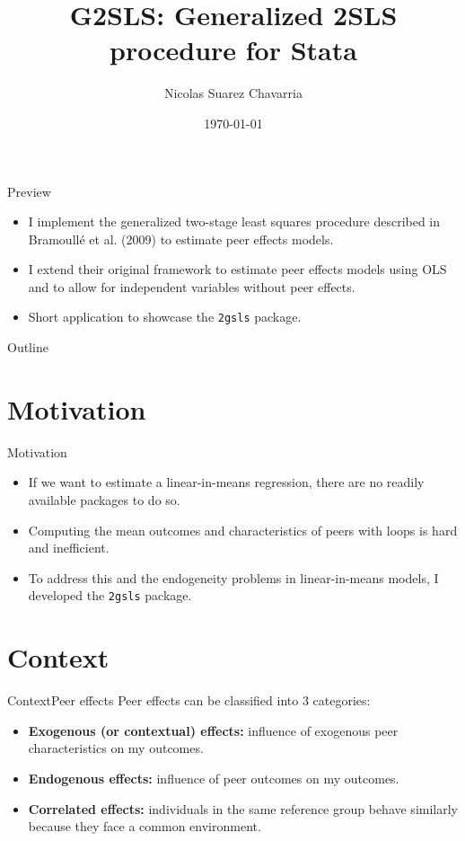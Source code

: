 \documentclass[aspectratio=169]{beamer}
\title[Generalized 2SLS]{ \textbf{G2SLS: Generalized 2SLS procedure for Stata}}
\author[Nicolas Suarez (Stanford University)]{Nicolas Suarez Chavarria}
\institute[Stanford University]
{\large{Department of Economics, Stanford University}}
\date[]{\today}
\begin{document}
\frame{\titlepage}

\begin{frame}{Preview}
\begin{itemize}
\item I implement the generalized two-stage least squares procedure described in Bramoullé et al. (2009) to estimate peer effects models.
\pause
\item I extend their original framework to estimate peer effects models using OLS and to allow for independent variables without peer effects.
\pause
\item Short application to showcase the \texttt{2gsls} package.
\end{itemize}
\end{frame}


\begin{frame}{Outline}
  \tableofcontents
\end{frame}

\section{Motivation}

\begin{frame}{Motivation}
\begin{itemize}
\item If we want to estimate a linear-in-means regression, there are no readily available packages to do so.
\pause
\item Computing the mean outcomes and characteristics of peers with loops is hard and inefficient.
\pause 
\item To address this and the endogeneity problems in linear-in-means models, I developed the \texttt{2gsls} package.
\end{itemize}
\end{frame}


\section{Context}
\begin{frame}{Context}{Peer effects}
Peer effects can be classified into 3 categories:
\pause
\begin{itemize}
\item \textbf{Exogenous (or contextual) effects:} influence of exogenous peer characteristics on my outcomes.
\item \textbf{Endogenous effects:} influence of peer outcomes on my outcomes.
\item \textbf{Correlated effects:} individuals in the same reference group behave similarly because they face a common environment.
\end{itemize}
\end{frame}
\end{document}

